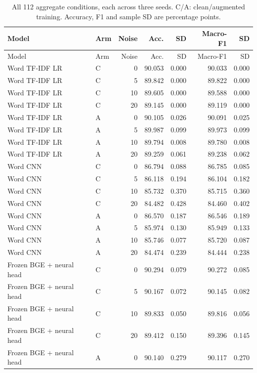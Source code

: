 \begin{longtable}{llrrrrr}
\caption{All 112 aggregate conditions, each across three seeds. C/A: clean/augmented training. Accuracy, F1 and sample SD are percentage points.}\label{tab:fullmetrics}\\
\toprule Model & Arm & Noise & Acc. & SD & Macro-F1 & SD \\ \midrule \endfirsthead
\toprule Model & Arm & Noise & Acc. & SD & Macro-F1 & SD \\ \midrule \endhead
Word TF-IDF LR & C & 0 & 90.053 & 0.000 & 90.033 & 0.000 \\
Word TF-IDF LR & C & 5 & 89.842 & 0.000 & 89.822 & 0.000 \\
Word TF-IDF LR & C & 10 & 89.605 & 0.000 & 89.588 & 0.000 \\
Word TF-IDF LR & C & 20 & 89.145 & 0.000 & 89.119 & 0.000 \\
Word TF-IDF LR & A & 0 & 90.105 & 0.026 & 90.091 & 0.025 \\
Word TF-IDF LR & A & 5 & 89.987 & 0.099 & 89.973 & 0.099 \\
Word TF-IDF LR & A & 10 & 89.794 & 0.008 & 89.780 & 0.008 \\
Word TF-IDF LR & A & 20 & 89.259 & 0.061 & 89.238 & 0.062 \\
Word CNN & C & 0 & 86.794 & 0.088 & 86.785 & 0.085 \\
Word CNN & C & 5 & 86.118 & 0.194 & 86.104 & 0.182 \\
Word CNN & C & 10 & 85.732 & 0.370 & 85.715 & 0.360 \\
Word CNN & C & 20 & 84.482 & 0.428 & 84.460 & 0.402 \\
Word CNN & A & 0 & 86.570 & 0.187 & 86.546 & 0.189 \\
Word CNN & A & 5 & 85.974 & 0.130 & 85.949 & 0.133 \\
Word CNN & A & 10 & 85.746 & 0.077 & 85.720 & 0.087 \\
Word CNN & A & 20 & 84.474 & 0.239 & 84.444 & 0.238 \\
Frozen BGE + neural head & C & 0 & 90.294 & 0.079 & 90.272 & 0.085 \\
Frozen BGE + neural head & C & 5 & 90.167 & 0.072 & 90.145 & 0.082 \\
Frozen BGE + neural head & C & 10 & 89.833 & 0.050 & 89.816 & 0.056 \\
Frozen BGE + neural head & C & 20 & 89.412 & 0.150 & 89.396 & 0.145 \\
Frozen BGE + neural head & A & 0 & 90.140 & 0.279 & 90.117 & 0.270 \\

\end{longtable}
